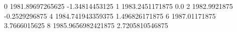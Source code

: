 0 1981.89697265625 -1.34814453125
1 1983.2451171875 0.0
2 1982.9921875 -0.2529296875
4 1984.741943359375 1.496826171875
6 1987.01171875 3.7666015625
8 1985.9656982421875 2.7205810546875

